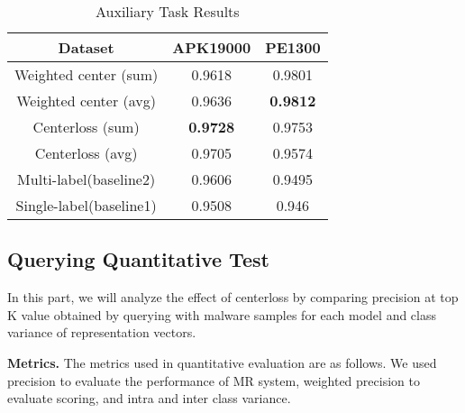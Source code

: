 \begin{table}[!htb]%
\caption{Auxiliary Task Results}
\label{tab:auxiliary_result}
\begin{minipage}{\columnwidth}
\begin{center}
\begin{tabular}{|c|c|c|}
\hline
Dataset             & APK19000 & PE1300 \\ \hline
Weighted center (sum)  & 0.9618   & 0.9801 \\ \hline
Weighted center (avg) & 0.9636   & \textbf{0.9812} \\ \hline
Centerloss (sum)         & \textbf{0.9728 }  & 0.9753 \\ \hline
Centerloss (avg)        & 0.9705   & 0.9574 \\ \hline
Multi-label(baseline2)          & 0.9606   & 0.9495 \\ \hline
Single-label(baseline1)              & 0.9508   & 0.946  \\ \hline
\end{tabular}
\end{center}
\bigskip\centering
\end{minipage}
\end{table}%


\subsection{Querying Quantitative Test}

In this part, we will analyze the effect of centerloss by comparing precision at top K value obtained by querying with malware samples for each model and class variance of representation vectors.

\textbf{Metrics. } The metrics used in quantitative evaluation are as follows. We used precision to evaluate the performance of MR system, weighted precision to evaluate scoring, and intra and inter class variance.

